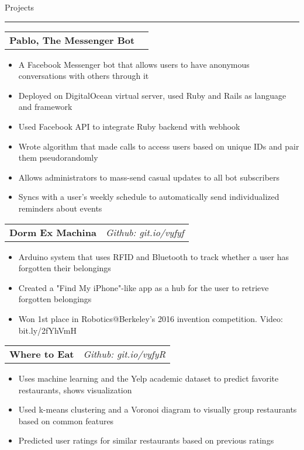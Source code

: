 \documentclass[11pt,letterpaper]{article}
\makeatletter
\newenvironment{topic}[1]
    {
    {\Large \centerline{#1}}
    \vspace*{0.03in}
    \hrule 
    \vspace*{0.05in}
    }
    {}
\newenvironment{event}
    {
    \begin{tabular*}{\textwidth}{l@{\extracolsep{\fill}}r}
    }
    {
    \end{tabular*}
    }
\makeatother
\begin{document}
    \begin{topic}{Projects}
        \begin{event}
        \textbf{Pablo, The Messenger Bot}
        \end{event}
            \begin{itemize}
                \item A Facebook Messenger bot that allows users to have anonymous conversations with others through it
                \item Deployed on DigitalOcean virtual server, used Ruby and Rails as language and framework
                \item Used Facebook API to integrate Ruby backend with webhook 
                \item Wrote algorithm that made calls to access users based on unique IDs and pair them pseudorandomly
                \item Allows administrators to mass-send casual updates to all bot subscribers
                \item Syncs with a user's weekly schedule to automatically send individualized reminders about events
            \end{itemize}

        \begin{event}
            \textbf{Dorm Ex Machina} & \emph{Github: git.io/vyfyf}
        \end{event}
            \begin{itemize}
                \item Arduino system that uses RFID and Bluetooth to track whether a user has forgotten their belongings
                \item Created a "Find My iPhone"-like app as a hub for the user to retrieve forgotten belongings
                \item Won 1st place in Robotics@Berkeley's 2016 invention competition. Video: bit.ly/2fYhVmH
            \end{itemize}

        \begin{event}
        \textbf{Where to Eat} & \emph{Github: git.io/vyfyR}
        \end{event}
            \begin{itemize}
                \item Uses machine learning and the Yelp academic dataset to predict favorite restaurants, shows visualization
                \item Used k-means clustering and a Voronoi diagram to visually group restaurants based on common features
                \item Predicted user ratings for similar restaurants based on previous ratings
            \end{itemize}

        
    \end{topic} \vspace*{0.1in}
\end{document}
